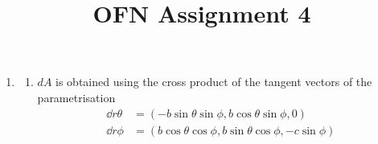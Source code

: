 \documentclass{X:/Documents/Coding/Latex/myassignment}
\title{OFN Assignment 4}
\begin{document}

\maketitle

\begin{enumerate}
\item 
\begin{enumerate}
	\item $dA$ is obtained using the cross product of the tangent vectors of the parametrisation
	\begin{align*}
		\dd r\theta &= \left(-b\sin\theta \sin\phi, b\cos\theta\sin\phi,0\right)\\
		\dd r\phi &= \left(b\cos\theta\cos\phi, b\sin\theta\cos\phi,-c\sin\phi\right)
	\end{align*}


\end{enumerate}
\end{enumerate}
\end{document}
